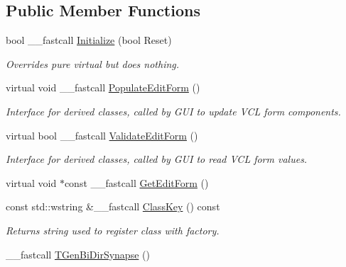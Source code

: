 \subsection*{Public Member Functions}
\begin{DoxyCompactItemize}
\item 
\hypertarget{class_t_gen_bi_dir_synapse_a8fa1e97923bdd2c10c300994bd669bfe}{bool \+\_\+\+\_\+fastcall \hyperlink{class_t_gen_bi_dir_synapse_a8fa1e97923bdd2c10c300994bd669bfe}{Initialize} (bool Reset)}\label{class_t_gen_bi_dir_synapse_a8fa1e97923bdd2c10c300994bd669bfe}

\begin{DoxyCompactList}\small\item\em Overrides pure virtual but does nothing. \end{DoxyCompactList}\item 
\hypertarget{class_t_gen_bi_dir_synapse_a372a2931ff3b8fff61c1d61ffdf9ecf1}{virtual void \+\_\+\+\_\+fastcall \hyperlink{class_t_gen_bi_dir_synapse_a372a2931ff3b8fff61c1d61ffdf9ecf1}{Populate\+Edit\+Form} ()}\label{class_t_gen_bi_dir_synapse_a372a2931ff3b8fff61c1d61ffdf9ecf1}

\begin{DoxyCompactList}\small\item\em Interface for derived classes, called by G\+U\+I to update V\+C\+L form components. \end{DoxyCompactList}\item 
\hypertarget{class_t_gen_bi_dir_synapse_ae0a649033ee575e0d0dc0166db02214a}{virtual bool \+\_\+\+\_\+fastcall \hyperlink{class_t_gen_bi_dir_synapse_ae0a649033ee575e0d0dc0166db02214a}{Validate\+Edit\+Form} ()}\label{class_t_gen_bi_dir_synapse_ae0a649033ee575e0d0dc0166db02214a}

\begin{DoxyCompactList}\small\item\em Interface for derived classes, called by G\+U\+I to read V\+C\+L form values. \end{DoxyCompactList}\item 
virtual void $\ast$const \+\_\+\+\_\+fastcall \hyperlink{class_t_gen_bi_dir_synapse_ada612e93b0d7a24ea55201e364bdf7cd}{Get\+Edit\+Form} ()
\item 
const std\+::wstring \&\+\_\+\+\_\+fastcall \hyperlink{class_t_gen_bi_dir_synapse_a7a704a5acb3ec4a36487a762fe87f784}{Class\+Key} () const 
\begin{DoxyCompactList}\small\item\em Returns string used to register class with factory. \end{DoxyCompactList}\item 
\hypertarget{class_t_gen_bi_dir_synapse_a9c9ddea96dcb18cfe9f47ae5c5cae29b}{\+\_\+\+\_\+fastcall \hyperlink{class_t_gen_bi_dir_synapse_a9c9ddea96dcb18cfe9f47ae5c5cae29b}{T\+Gen\+Bi\+Dir\+Synapse} ()}\label{class_t_gen_bi_dir_synapse_a9c9ddea96dcb18cfe9f47ae5c5cae29b}


\end{DoxyCompactItemize}
